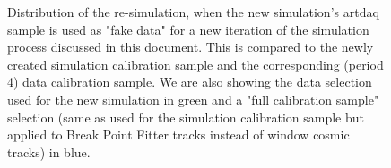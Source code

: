 \documentclass[12pt]{article}
\begin{document}
\begin{figure}[!ht]

\caption{Distribution of the re-simulation, when the new simulation's artdaq sample is used as "fake data" for a new iteration of the simulation process discussed in this document. This is compared to the newly created simulation calibration sample and the corresponding (period 4) data calibration sample. We are also showing the data selection used for the new simulation in green and a "full calibration sample" selection (same as used for the simulation calibration sample but applied to Break Point Fitter tracks instead of window cosmic tracks) in blue.}
\label{figSimVersionComparison}
\end{figure}
\end{document}
